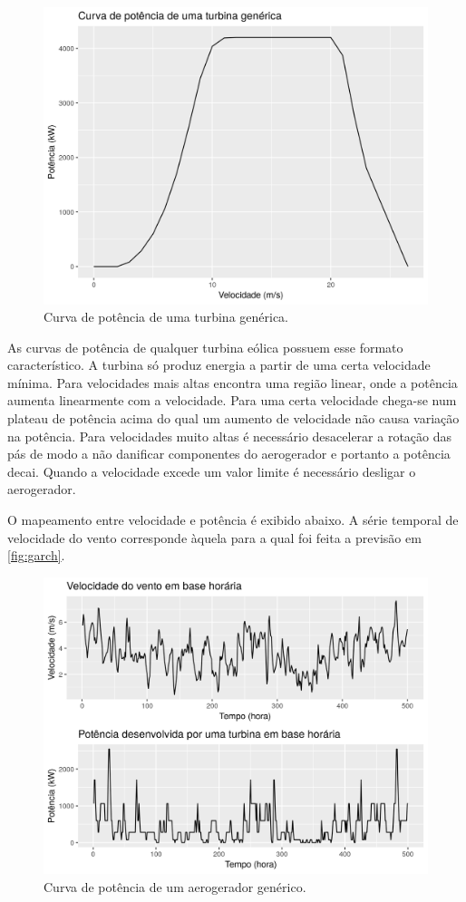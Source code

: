 \documentclass[
	12pt,				%
	openright,			%
	oneside,			%
	a4paper,			%
	english,			%
	french,				%
	spanish,			%
	brazil				%
	]{abntex2}
\begin{document}
\begin{figure}[h]
    \centering
	\includegraphics[width=\textwidth]{power_curve}
	\caption{Curva de potência de uma turbina genérica.}
\end{figure}
\FloatBarrier

As curvas de potência de qualquer turbina eólica possuem esse formato característico. A turbina só produz energia a partir de uma certa velocidade mínima. Para velocidades mais altas encontra uma região linear, onde a potência aumenta linearmente com a velocidade. Para uma certa velocidade chega-se num plateau de potência acima do qual um aumento de velocidade não causa variação na potência. Para velocidades muito altas é necessário desacelerar a rotação das pás de modo a não danificar componentes do aerogerador e portanto a potência decai. Quando a velocidade excede um valor limite é necessário desligar o aerogerador.

O mapeamento entre velocidade e potência é exibido abaixo. A série temporal de velocidade do vento corresponde àquela para a qual foi feita a previsão em 	\ref{fig:garch}.

\begin{figure}[h]
    \centering
	\includegraphics[width=\textwidth]{speed_power}
	\caption{Curva de potência de um aerogerador genérico.}
\end{figure}
\FloatBarrier
\end{document}
